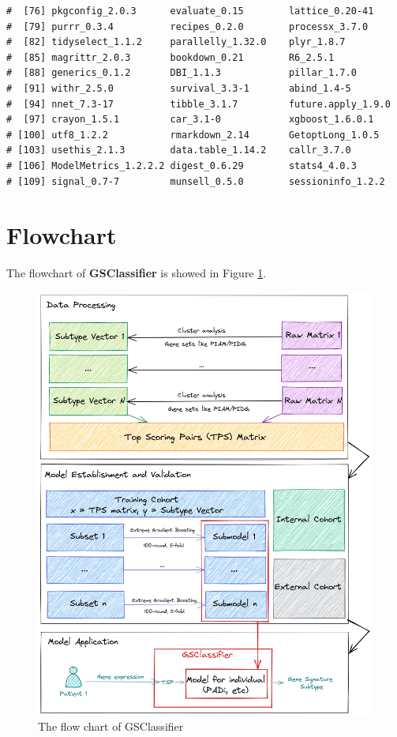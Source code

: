 \documentclass[
  12pt,
]{book}
\begin{document}
\begin{lstlisting}
#  [76] pkgconfig_2.0.3      evaluate_0.15        lattice_0.20-41     
#  [79] purrr_0.3.4          recipes_0.2.0        processx_3.7.0      
#  [82] tidyselect_1.1.2     parallelly_1.32.0    plyr_1.8.7          
#  [85] magrittr_2.0.3       bookdown_0.21        R6_2.5.1            
#  [88] generics_0.1.2       DBI_1.1.3            pillar_1.7.0        
#  [91] withr_2.5.0          survival_3.3-1       abind_1.4-5         
#  [94] nnet_7.3-17          tibble_3.1.7         future.apply_1.9.0  
#  [97] crayon_1.5.1         car_3.1-0            xgboost_1.6.0.1     
# [100] utf8_1.2.2           rmarkdown_2.14       GetoptLong_1.0.5    
# [103] usethis_2.1.3        data.table_1.14.2    callr_3.7.0         
# [106] ModelMetrics_1.2.2.2 digest_0.6.29        stats4_4.0.3        
# [109] signal_0.7-7         munsell_0.5.0        sessioninfo_1.2.2
\end{lstlisting}

\hypertarget{flowchart}{%
\section{Flowchart}\label{flowchart}}

The flowchart of \textbf{GSClassifier} is showed in Figure \ref{fig:flowchart}.

\begin{figure}

{\centering \includegraphics[width=0.9\linewidth]{./fig/flowchart} 

}

\caption{The flow chart of GSClassifier}\label{fig:flowchart}
\end{figure}
\end{document}
